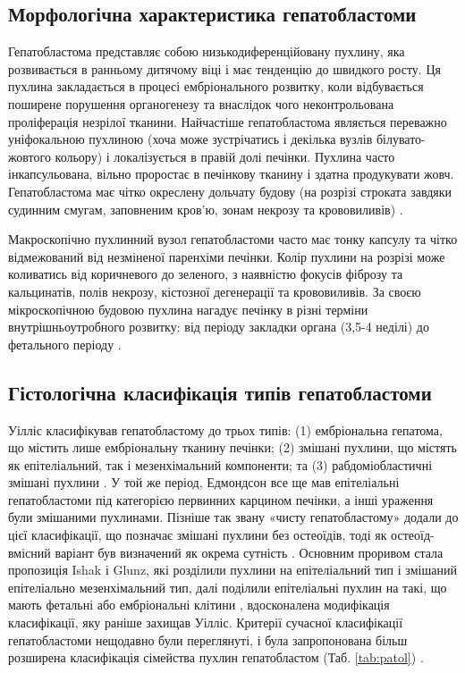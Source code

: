 \subsection{Морфологічна характеристика гепатобластоми}
  
Гепатобластома представляє собою низькодиференційовану пухлину, яка розвивається в ранньому дитячому віці і має тенденцію до швидкого росту. Ця пухлина закладається в процесі ембріонального розвитку, коли відбувається поширене порушення органогенезу та внаслідок чого неконтрольована проліферація незрілої тканини. Найчастіше гепатобластома являється переважно уніфокальною пухлиною (хоча може зустрічатись і декілька вузлів білувато-жовтого кольору) і локалізується  в правій долі печінки. Пухлина часто інкапсульована, вільно проростає в печінкову тканину і здатна продукувати жовч. Гепатобластома має  чітко окреслену дольчату будову (на розрізі строката завдяки  судинним смугам, заповненим кров’ю, зонам некрозу та крововиливів) \cite{pmid32421442}.

Макроскопічно пухлинний вузол гепатобластоми часто має тонку капсулу та чітко відмежований від незміненої  паренхіми печінки. Колір пухлини на розрізі може коливатись від коричневого до зеленого, з наявністю фокусів фіброзу та кальцинатів, полів некрозу, кістозної дегенерації та крововиливів. 
За своєю мікроскопічною будовою пухлина нагадує печінку в різні терміни  внутрішньоутробного розвитку: від періоду закладки органа (3,5-4 неділі) до фетального періоду \cite{pmid20070564}.

\subsection{Гістологічна класифікація типів гепатобластоми}
 Уілліс класифікував гепатобластому до трьох типів: (1) ембріональна гепатома, що містить лише ембріональну тканину печінки; (2) змішані пухлини, що містять як епітеліальний, так і мезенхімальний компоненти; та (3) рабдоміобластичні змішані пухлини  \cite{pmid24852330}. У той же період, Едмондсон все ще мав епітеліальні гепатобластоми під категорією первинних карцином печінки, а інші ураження були змішаними пухлинами. Пізніше так звану «чисту гепатобластому» додали до цієї класифікації, що позначає змішані пухлини без остеоїдів, тоді як остеоїд-вмісний варіант був визначений як окрема сутність \cite{pmid32421442}. Основним проривом стала пропозиція Ishak і Glunz, які розділили пухлини на епітеліальний тип і змішаний епітеліально мезенхімальний тип, далі поділили епітеліальні пухлин на такі, що мають фетальні або ембріональні клітини \cite{pmid20070564}, вдосконалена модифікація класифікації, яку раніше захищав Уілліс. Критерії сучасної класифікації гепатобластоми нещодавно були переглянуті, і була запропонована більш розширена класифікація сімейства пухлин гепатобластом (Таб. \ref{tab:patol}) \cite{pmid24759227}. 


